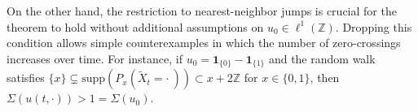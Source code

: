 \documentclass[12pt,reqno,oneside]{amsart}
\numberwithin{equation}{section}
\theoremstyle{definition}
\theoremstyle{remark}
\newcommand{\Z}{\mathbb{Z}}
\newcommand{\bbone}{\boldsymbol 1}
\begin{document}
On the other hand, the restriction to nearest-neighbor jumps is crucial for
the theorem to hold without additional assumptions on $u_0 \in \ell^1(\Z)$.
Dropping this condition allows simple counterexamples in which the number of
zero-crossings increases over time. For instance, if $u_0=\bbone_{\{0\}}-\bbone_{\{1\}}$
and the random walk satisfies
$\{x\} \subsetneq \text{supp}(P_x(\tilde{X}_t = \cdot \ )) \subset x+2\Z$ for
$x \in \{0,1\}$, then $\Sigma(u(t,\cdot)) > 1 = \Sigma(u_0)$.


\providecommand{\bysame}{\leavevmode\hbox to3em{\hrulefill}\thinspace}
\providecommand\MR{}
\renewcommand\MR[1]{\relax\ifhmode\unskip\spacefactor3000
\space\fi \MRhref{#1}{#1}}
\providecommand\MRhref{}
\renewcommand{\MRhref}[2]%
{\href{http://www.ams.org/mathscinet-getitem?mr=#1}{MR#2}}
\providecommand{\href}[2]{#2}
\end{document}
